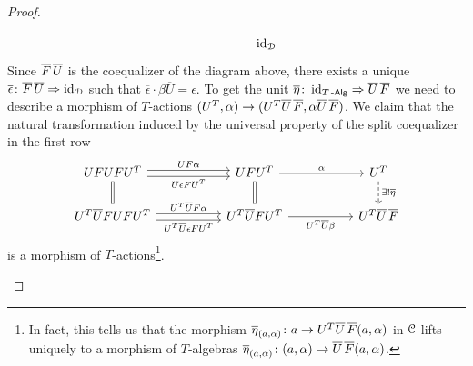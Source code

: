 \documentclass[a4paper,11pt,oneside,openany]{scrbook}
\begin{document}
\begin{proof}
\begin{enumerate}
\[\begin{tikzcd}
				      && \id_{\D}
			      \end{tikzcd}
		      \]
		      Since $\overline{F}\hspace{.5mm}\overline{U}$ is the coequalizer of the diagram above, there exists a unique $\overline{\epsilon}\colon\overline{F}\hspace{.5mm}\overline{U}\Rightarrow\operatorname{id}_{\operatorname{\mathcal{D}}}$ such that $\overline{\epsilon}\cdot\beta\overline{U}=\epsilon$. To get the unit $\overline{\eta}\colon\operatorname{id}_{T\operatorname{-\mathsf{Alg}}}\Rightarrow\overline{U}\hspace{.5mm}\overline{F}$ we need to describe a morphism of $T$-actions $(U^T,\alpha)\to(U^T\overline{U}\hspace{.5mm}\overline{F},\alpha\overline{U}\hspace{.5mm}\overline{F})$. We claim that the natural transformation induced by the universal property of the split coequalizer in the first row
		      \[
			      \begin{tikzcd}[column sep=1.8cm]
				      UFUFU^T\arrow[r, shift left, "UF\alpha"] \arrow[r, shift right, "U\epsilon FU^T"']\arrow[d, equal]	& UFU^T\arrow[r, "\alpha"] \arrow[d, equal] & U^T \arrow[d, dashed, "\exists!\overline{\eta}"]\\
				      U^T\overline{U}FUFU^T\arrow[r, shift left,  "U^T\overline{U}F\alpha"] \arrow[r, shift right, "U^T\overline{U}\epsilon FU^T"']&U^T\overline{U}FU^T\arrow[r, "U^T\overline{U}\beta"']& U^T\overline{U}\hspace{.5mm}\overline{F}
			      \end{tikzcd}
		      \]
		      is a morphism of $T$-actions\footnote{In fact, this tells us that the morphism $\overline{\eta}_{(a,\alpha)}\colon a\to U^T\overline{U}\hspace{.5mm}\overline{F}(a,\alpha)$ in $\operatorname{\mathcal{C}}$ lifts uniquely to a morphism of $T$-algebras $\overline{\eta}_{(a,\alpha)}\colon(a,\alpha)\to\overline{U}\hspace{.5mm}\overline{F}(a,\alpha)$.}.


\end{enumerate}
\end{proof}
\end{document}
